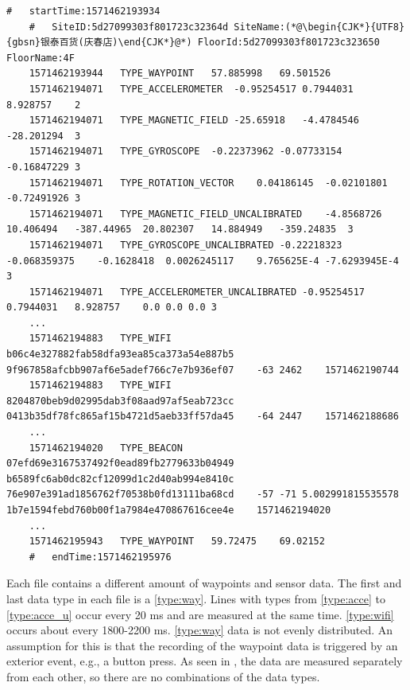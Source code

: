 
\begin{lstlisting}[caption={A snippet from the dataset of the file 5daa9e38df065a00069beb79.txt of the floor F4},label={lst:dataset}]
    #   startTime:1571462193934
    #   SiteID:5d27099303f801723c32364d SiteName:(*@\begin{CJK*}{UTF8}{gbsn}银泰百货(庆春店)\end{CJK*}@*) FloorId:5d27099303f801723c323650 FloorName:4F
    1571462193944   TYPE_WAYPOINT   57.885998   69.501526
    1571462194071   TYPE_ACCELEROMETER  -0.95254517 0.7944031   8.928757    2
    1571462194071   TYPE_MAGNETIC_FIELD -25.65918   -4.4784546  -28.201294  3
    1571462194071   TYPE_GYROSCOPE  -0.22373962 -0.07733154 -0.16847229 3
    1571462194071   TYPE_ROTATION_VECTOR    0.04186145  -0.02101801 -0.72491926 3
    1571462194071   TYPE_MAGNETIC_FIELD_UNCALIBRATED    -4.8568726  10.406494   -387.44965  20.802307   14.884949   -359.24835  3
    1571462194071   TYPE_GYROSCOPE_UNCALIBRATED -0.22218323 -0.068359375    -0.1628418  0.0026245117    9.765625E-4 -7.6293945E-4   3
    1571462194071   TYPE_ACCELEROMETER_UNCALIBRATED -0.95254517 0.7944031   8.928757    0.0 0.0 0.0 3
    ...
    1571462194883   TYPE_WIFI   b06c4e327882fab58dfa93ea85ca373a54e887b5    9f967858afcbb907af6e5adef766c7e7b936ef07    -63 2462    1571462190744
    1571462194883   TYPE_WIFI   8204870beb9d02995dab3f08aad97af5eab723cc    0413b35df78fc865af15b4721d5aeb33ff57da45    -64 2447    1571462188686
    ...
    1571462194020   TYPE_BEACON 07efd69e3167537492f0ead89fb2779633b04949    b6589fc6ab0dc82cf12099d1c2d40ab994e8410c    76e907e391ad1856762f70538b0fd13111ba68cd    -57 -71 5.002991815535578   1b7e1594febd760b00f1a7984e470867616cee4e    1571462194020
    ...
    1571462195943   TYPE_WAYPOINT   59.72475    69.02152
    #   endTime:1571462195976
\end{lstlisting}

Each file contains a different amount of waypoints and sensor data.
The first and last data type in each file is a \ref{type:way}.
Lines with types from \ref{type:acce} to \ref{type:acce_u} occur every 20 ms and are measured at the same time.
\ref{type:wifi} occurs about every 1800-2200 ms.
\ref{type:way} data is not evenly distributed.
An assumption for this is that the recording of the waypoint data is triggered by an exterior event, e.g., a button press.
As seen in , the data are measured separately from each other, so there are no combinations of the data types.

